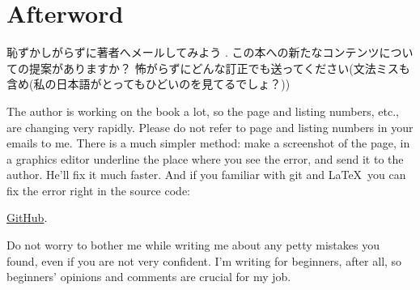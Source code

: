 \part*{Afterword}


恥ずかしがらずに著者へメールしてみよう
\GTT{<\EMAIL>}.
この本への新たなコンテンツについての提案がありますか？
怖がらずにどんな訂正でも送ってください(文法ミスも含め(私の日本語がとってもひどいのを見てるでしょ？))

The author is working on the book a lot, so the page and listing numbers, etc., are changing very rapidly.
Please do not refer to page and listing numbers in your emails to me.
There is a much simpler method: make a screenshot of the page, in a graphics editor underline the place where you see the error,
and send it to the author. He'll fix it much faster.
And if you familiar with git and \LaTeX\, you can fix the error right in the source code: 

\href{http://go.yurichev.com/17089}{GitHub}.

Do not worry to bother me while writing me about any petty mistakes you found, even if you are not very confident.
I'm writing for beginners, after all, so beginners' opinions and comments are crucial for my job.
